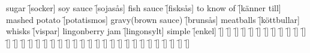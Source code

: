 \begin{questions}
\begin{multicols}{2}
        \question sugar \f[socker]
        \question soy sauce \f[sojasås]
        \question fish sauce \f[fisksås]
        \question to know of \f[känner till]
        \question mashed potato \f[potatismos]
        \question gravy(brown sauce) \f[brunsås]
        \question meatballs \f[köttbullar]
        \question whisks \f[vispar]
        \question lingonberry jam \f[lingonsylt]
        \question simple \f[enkel]
        \question  \f[]
        \question  \f[]
        \question  \f[]
        \question  \f[]
        \question  \f[]
        \question  \f[]
        \question  \f[]
        \question  \f[]
        \question  \f[]
        \question  \f[]
        \question  \f[]
        \question  \f[]
        \question  \f[]
        \question  \f[]
        \question  \f[]
        \question  \f[]
        \question  \f[]
        \question  \f[]
        \question  \f[]
        \question  \f[]
        \question  \f[]
        \question  \f[]
        \question  \f[]
        \question  \f[]
        \question  \f[]
        \question  \f[]
        \question  \f[]
        \question  \f[]
        \question  \f[]
        \question  \f[]
        \question  \f[]
        \question  \f[]
        \question  \f[]
        \question  \f[]
        \question  \f[]
        \question  \f[]
        \question  \f[]
    \end{multicols}
\end{questions}
